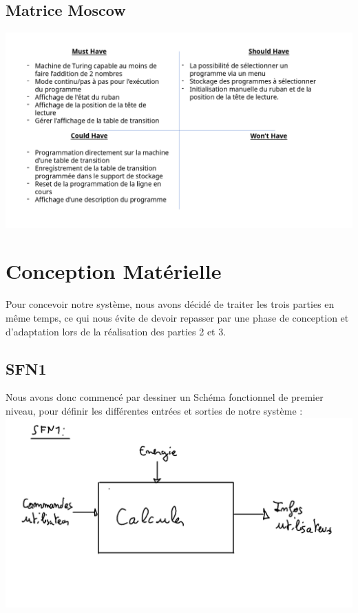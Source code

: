 \documentclass[12pt]{report}
\begin{document}
 	 \subsection{Matrice Moscow}
 	 \includegraphics[width=\textwidth]{img/moscow}
	 \section{Conception Matérielle}
	 Pour concevoir notre système, nous avons décidé de traiter les trois parties en même temps, ce qui nous évite de devoir repasser par une phase de conception et d'adaptation lors de la réalisation des parties 2 et 3.\\
	 \subsection{SFN1}
	 Nous avons donc commencé par dessiner un Schéma fonctionnel de premier niveau, pour définir les différentes entrées et sorties de notre système :\\
	 \includegraphics[width=\textwidth]{img/SFN1}
\end{document}
